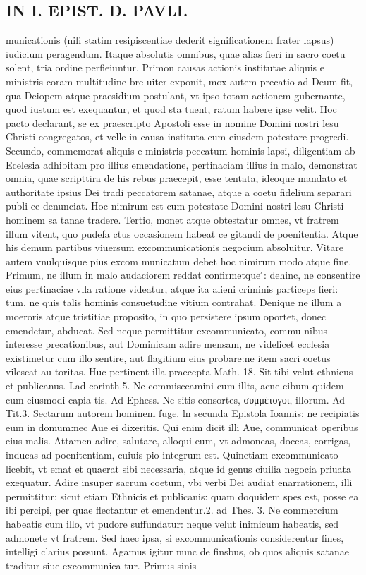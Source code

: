 \documentclass{article}
\begin{document}
\begin{pages}
\section*{IN I. EPIST. D. PAVLI. }
\marginpar{[ p.72 ]}\pstart municationis (nili statim resipiscentiae dederit significationem frater lapsus) iudicium peragendum. Itaque  absolutis omnibus, quae alias fieri in sacro coetu solent, tria ordine perfieiuntur. Primon causas actionis institutae aliquis e ministris coram multitudine bre uiter exponit, mox autem precatio ad Deum fit, qua Deiopem atque praesidium postulant, vt ipso totam actionem gubernante, quod iustum est exequantur, et quod sta tuent, ratum habere ipse velit. Hoc pacto declarant, se ex praescripto Apostoli esse in nomine Domini nostri lesu Christi congregatos, et velle in causa instituta cum eiusdem potestare progredi. Secundo, commemorat aliquis e ministris peccatum hominis lapsi, diligentiam ab Ecelesia adhibitam pro illius emendatione, pertinaciam illius in malo, demonstrat omnia, quae scripttira de his rebus praecepit, esse tentata, ideoque  mandato et authoritate ipsius Dei tradi peccatorem satanae, atque  a coetu fidelium separari publi ce denunciat. Hoc nimirum est cum potestate Domini nostri lesu Christi hominem sa tanae tradere. Tertio, monet atque  obtestatur omnes, vt fratrem illum vitent, quo pudefa ctus occasionem habeat ce gitandi de poenitentia. Atque his demum partibus viuersum excommunicationis negocium absoluitur. Vitare autem vnulquisque  pius excom municatum debet hoc nimirum modo atque  fine. Primum, ne illum in malo audaciorem reddat confirmetque ́: dehinc, ne consentire eius pertinaciae vlla ratione videatur, atque  ita alieni criminis particeps fieri: tum, ne quis talis hominis consuetudine vitium contrahat. Denique  ne illum a moeroris atque  tristitiae proposito, in quo persistere ipsum oportet, donec emendetur, abducat. Sed neque  permittitur excommunicato, commu nibus interesse precationibus, aut Dominicam adire mensam, ne videlicet ecclesia existimetur cum illo sentire, aut flagitium eius probare:ne item sacri coetus vilescat au toritas. Huc pertinent illa praecepta Math. 18. Sit tibi velut ethnicus et publicanus. I.ad corinth.5. Ne commisceamini cum illts, acne cibum quidem cum eiusmodi capia tis. Ad Ephess. Ne sitis consortes, συμμέτογοι, illorum. Ad Tit.3. Sectarum autorem hominem fuge. ln secunda Epistola Ioannis: ne recipiatis eum in domum:nec Aue ei dixeritis. Qui enim dicit illi Aue, communicat operibus eius malis. Attamen adire, salutare, alloqui eum, vt admoneas, doceas, corrigas, inducas ad poenitentiam, cuiuis pio integrum est. Quinetiam excommunicato licebit, vt emat et quaerat sibi necessaria, atque id genus ciuilia negocia priuata exequatur. Adire insuper sacrum coetum, vbi verbi Dei audiat enarrationem, illi permittitur: sicut etiam Ethnicis et publicanis: quam doquidem spes est, posse ea ibi percipi, per quae flectantur et emendentur.2. ad Thes. 3. Ne commercium habeatis cum illo, vt pudore suffundatur: neque velut inimicum habeatis, sed admonete vt fratrem. Sed haec ipsa, si excommunicationis considerentur fines, intelligi clarius possunt.  \pend\pstart Agamus igitur nunc de finsbus, ob quos aliquis satanae traditur siue excommunica tur. Primus sinis 
\end{pages}
\end{document}
